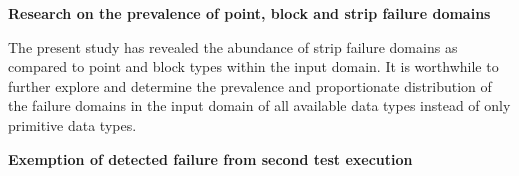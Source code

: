 \clearpage
\newpage


\textbf{Research on the prevalence of point, block and strip failure domains}

The present study has revealed the abundance of strip failure domains as compared to point and block types within the input domain. It is worthwhile to further explore and determine the prevalence and proportionate distribution of the failure domains in the input domain of all available data types instead of only primitive data types. 




\textbf{Exemption of detected failure from second test execution}



